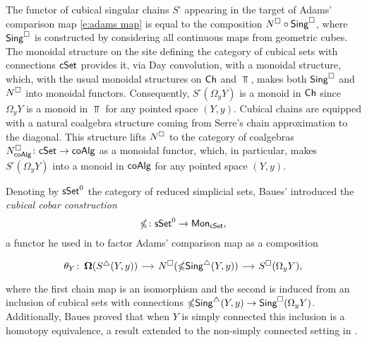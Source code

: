 The functor of cubical singular chains $S^\square$ appearing in the target of Adams' comparison map \eqref{e:adams map} is equal to the composition $N^{\square} \circ \mathsf{Sing}^{\square}$, where $\mathsf{Sing}^{\square}$ is constructed by considering all continuous maps from geometric cubes.
The monoidal structure on the site defining the category of cubical sets with connections $\mathsf{cSet}$ provides it, via Day convolution, with a monoidal structure, which, with the usual monoidal structures on $\mathsf{Ch}$ and $\Top$, makes both $\mathsf{Sing}^{\square}$ and $N^{\square}$ into monoidal functors.
Consequently, $S^\square(\Omega_y Y)$ is a monoid in $\mathsf{Ch}$ since $\Omega_y Y$ is a monoid in $\Top$ for any pointed space $(Y, y)$.
Cubical chains are equipped with a natural coalgebra structure coming from Serre's chain approximation to the diagonal.
This structure lifts $N^{\square}$ to the category of coalgebras $N^{\square}_{\mathsf{coAlg}} \colon \mathsf{cSet} \to \mathsf{coAlg}$ as a monoidal functor, which, in particular, makes $S^\square(\Omega_y Y)$ into a monoid in $\mathsf{coAlg}$ for any pointed space $(Y, y)$.

Denoting by $\mathsf{sSet}^0$ the category of reduced simplicial sets, Baues' introduced the \textit{cubical cobar construction}
\begin{equation*}
\mathbb{\Omega} \colon \mathsf{sSet}^0 \to \mathsf{Mon}_{\mathsf{cSet}},
\end{equation*}
a functor he used in \cite{baues1998hopf} to factor Adams' comparison map as a composition
\begin{equation} \label{e:baues factorization of adams map}
\begin{tikzcd}[column sep = small]
\theta_Y \colon \cobar(\sS(Y, y)) \arrow[r] &
\cchains(\gcobar \sSing(Y, y)) \arrow[r] &
S^{\square}(\Omega_y Y),
\end{tikzcd}
\end{equation}
where the first chain map is an isomorphism and the second is induced from an inclusion of cubical sets with connections $\mathbb{\Omega} \mathsf{Sing}^{\triangle}(Y, y) \to \mathsf{Sing}^{\square}(\Omega_y Y)$.
Additionally, Baues proved that when $Y$ is simply connected this inclusion is a homotopy equivalence, a result extended to the non-simply connected setting in \cite{rivera2019path}.

